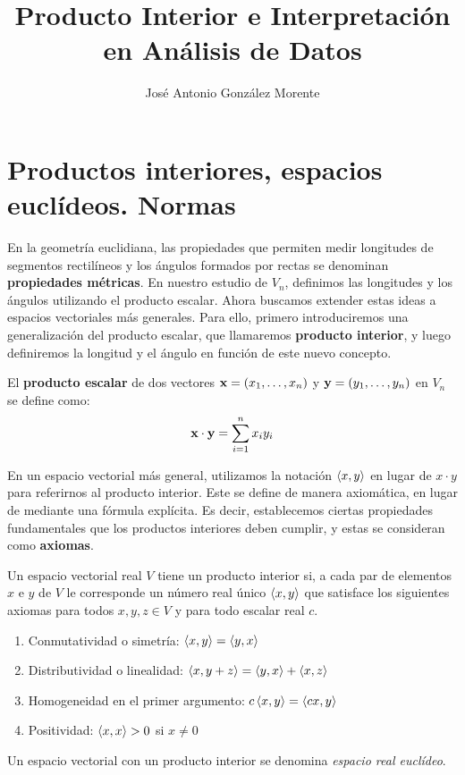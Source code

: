 \documentclass[a4paper,12pt]{article}
\title{\bfseries Producto Interior e Interpretación en Análisis de Datos}
\author{José Antonio González Morente}
\begin{document}
\maketitle

\begin{abstract}
\end{abstract}

\tableofcontents

\section{Productos interiores, espacios euclídeos. Normas}

En la geometría euclidiana, las propiedades que permiten medir longitudes de segmentos rectilíneos y los ángulos formados por rectas se denominan \textbf{propiedades métricas}. En nuestro estudio de $V_n$, definimos las longitudes y los ángulos utilizando el producto escalar. Ahora buscamos extender estas ideas a espacios vectoriales más generales. Para ello, primero introduciremos una generalización del producto escalar, que llamaremos \textbf{producto interior}, y luego definiremos la longitud y el ángulo en función de este nuevo concepto.

El \textbf{producto escalar} de dos vectores $\mathbf{x}=(x_1, \dots, x_n)$ y $\mathbf{y}=(y_1, \dots, y_n)$ en $V_n$ se define como:
\begin{equation}\label{eq:1}
    \mathbf{x} \cdot \mathbf{y} = \sum_{i=1}^n x_i y_i
\end{equation}

En un espacio vectorial más general, utilizamos la notación $\left\langle x,y\right\rangle$ en lugar de $x\cdot y$ para referirnos al producto interior. Este se define de manera axiomática, en lugar de mediante una fórmula explícita. Es decir, establecemos ciertas propiedades fundamentales que los productos interiores deben cumplir, y estas se consideran como \textbf{axiomas}.

\begin{definition}
    Un espacio vectorial real $V$ tiene un producto interior si, a cada par de elementos $x$ e $y$ de $V$ le corresponde un número real único $\left\langle x,y\right\rangle$ que satisface los siguientes axiomas para todos $x,y,z \in V$ y para todo escalar real $c$.
    \begin{enumerate}
        \item Conmutatividad o simetría: $\left\langle x,y\right\rangle=\left\langle y,x\right\rangle$
        \item Distributividad o linealidad: $\left\langle x,y+z\right\rangle=\left\langle y,x\right\rangle+\left\langle x,z\right\rangle$
        \item Homogeneidad en el primer argumento: $c\left\langle x,y\right\rangle=\left\langle cx,y\right\rangle$
        \item Positividad: $\left\langle x,x\right\rangle>0$ si $x\neq 0$
    \end{enumerate}
    Un espacio vectorial con un producto interior se denomina {\it espacio real euclídeo}.
\end{definition}
\end{document}
